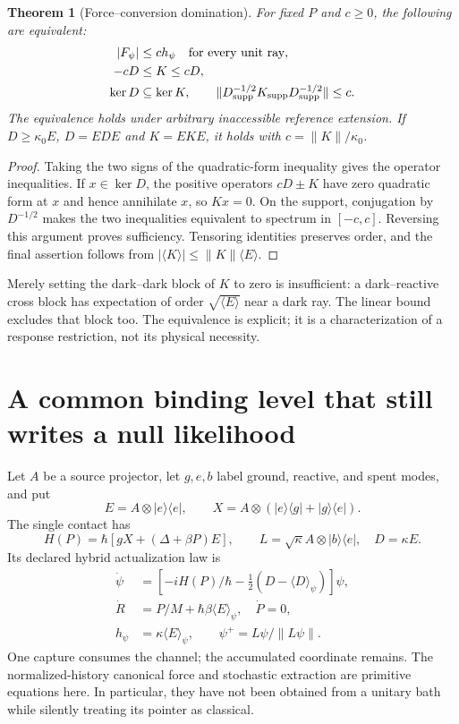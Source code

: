 \documentclass[11pt,oneside,openany]{book}
\newtheorem{theorem}{Theorem}[chapter]
\theoremstyle{definition}
\theoremstyle{remark}\newtheorem{remark}[theorem]{Remark}
\begin{document}
\begin{theorem}[Force--conversion domination]
\label{mat:domination}
For fixed $P$ and $c\ge0$, the following are equivalent:
\begin{align}
 |F_\psi|&\le c h_\psi\quad\hbox{for every unit ray},\\
 -cD&\le K\le cD,\\
 \ker D&\subseteq\ker K,\qquad
 \|D_{\rm supp}^{-1/2}K_{\rm supp}D_{\rm supp}^{-1/2}\|\le c.
 \label{mat:dominationeq}
\end{align}
The equivalence holds under arbitrary inaccessible reference extension. If $D\ge\kappa_0E$, $D=EDE$ and $K=EKE$, it holds with $c=\|K\|/\kappa_0$.
\end{theorem}
\begin{proof}
Taking the two signs of the quadratic-form inequality gives the operator inequalities. If $x\in\ker D$, the positive operators $cD\pm K$ have zero quadratic form at $x$ and hence annihilate $x$, so $Kx=0$. On the support, conjugation by $D^{-1/2}$ makes the two inequalities equivalent to spectrum in $[-c,c]$. Reversing this argument proves sufficiency. Tensoring identities preserves order, and the final assertion follows from $|\langle K\rangle|\le\|K\|\langle E\rangle$.
\end{proof}

Merely setting the dark--dark block of $K$ to zero is insufficient: a dark--reactive cross block has expectation of order $\sqrt{\langle E\rangle}$ near a dark ray. The linear bound excludes that block too. The equivalence is explicit; it is a characterization of a response restriction, not its physical necessity.

\section{A common binding level that still writes a null likelihood}

Let $A$ be a source projector, let $g,e,b$ label ground, reactive, and spent modes, and put
\[
 E=A\otimes|e\rangle\langle e|,
 \qquad X=A\otimes(|e\rangle\langle g|+|g\rangle\langle e|).
\]
The single contact has
\begin{equation}
 H(P)=\hbar[gX+(\Delta+\beta P)E],\qquad
 L=\sqrt\kappa A\otimes|b\rangle\langle e|,
 \quad D=\kappa E.
 \label{mat:hybridH}
\end{equation}
Its declared hybrid actualization law is
\begin{align}
 \dot\psi&=[-iH(P)/\hbar-\tfrac12(D-\langle D\rangle_\psi)]\psi,\\
 \dot R&=P/M+\hbar\beta\langle E\rangle_\psi,\quad\dot P=0,\\
 h_\psi&=\kappa\langle E\rangle_\psi,\qquad
 \psi^+=L\psi/\|L\psi\|.
 \label{mat:hybridlaw}
\end{align}
One capture consumes the channel; the accumulated coordinate remains. The normalized-history canonical force and stochastic extraction are primitive equations here. In particular, they have not been obtained from a unitary bath while silently treating its pointer as classical.
\end{document}
